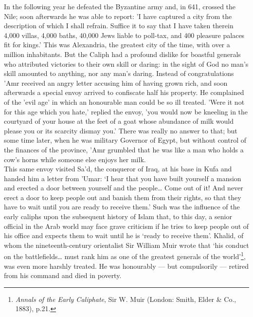 \documentclass[10pt, twoside]{book}
\begin{document}
In the following year he defeated the Byzantine army and, in 641, crossed the Nile; soon afterwards he was able to report: 'I have captured a city from the description of which I shall refrain. Suffice it to say that I have taken therein 4,000 villas, 4,000 baths, 40,000 Jews liable to poll\hyp{}tax, and 400 pleasure palaces fit for kings.' This was Alexandria, the greatest city of the time, with over a million inhabitants. But the Caliph had a profound dislike for boastful generals who attributed victories to their own skill or daring: in the sight of God no man's skill amounted to anything, nor any man's daring. Instead of congratulations 'Amr received an angry letter accusing him of having grown rich, and soon afterwards a special envoy arrived to confiscate half his property. He complained of the 'evil age' in which an honourable man could be so ill treated. 'Were it not for this age which you hate,' replied the envoy, 'you would now be kneeling in the courtyard of your house at the feet of a goat whose abundance of milk would please you or its scarcity dismay you.' There was really no answer to that; but some time later, when he was military Governor of Egypt, but without control of the finances of the province, 'Amr grumbled that he was like a man who holds a cow's horns while someone else enjoys her milk. \\

This same envoy visited Sa'd, the conqueror of Iraq, at his base in Kufa and handed him a letter from 'Umar: `I hear that you have built yourself a mansion and erected a door between yourself and the people\ldots{} Come out of it! And never erect a door to keep people out and banish them from their rights, so that they have to wait until you are ready to receive them.' Such was the influence of the early caliphs upon the subsequent history of Islam that, to this day, a senior official in the Arab world may face grave criticism if he tries to keep people out of his office and expects them to wait until he is `ready to receive them'. Khalid, of whom the nineteenth\hyp{}century orientalist Sir William Muir wrote that `his conduct on the battlefields\ldots{} must rank him as one of the greatest generals of the world'\footnote{\emph{Annals of the Early Caliphate}, Sir W. Muir (London: Smith, Elder \& Co., 1883), p.21.}, was even more harshly treated. He was honourably --- but compulsorily --- retired from his command and died in poverty. \\
\end{document}
